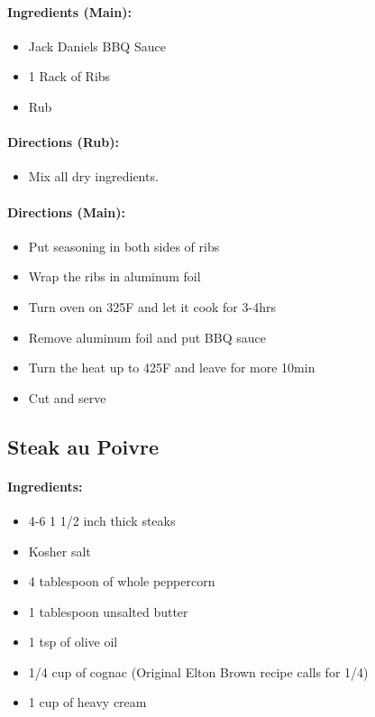 \documentclass{article}
\begin{document}
\paragraph{Ingredients (Main):}
\begin{itemize}
    \item Jack Daniels BBQ Sauce
    \item 1 Rack of Ribs
    \item Rub
\end{itemize}  

\paragraph{Directions (Rub):}
\begin{itemize}
    \item Mix all dry ingredients.
\end{itemize}  

\paragraph{Directions (Main):}
\begin{itemize}
    \item Put seasoning in both sides of ribs
    \item Wrap the ribs in aluminum foil
    \item Turn oven on 325F and let it cook for 3-4hrs
    \item Remove aluminum foil and put BBQ sauce
    \item Turn the heat up to 425F and leave for more 10min
    \item Cut and serve
\end{itemize} 

\subsection{Steak au Poivre}

\paragraph{Ingredients:}
\begin{itemize}
    \item 4-6 1 1/2 inch thick steaks
    \item Kosher salt
    \item 4 tablespoon of whole peppercorn
    \item 1 tablespoon unsalted butter
    \item 1 tsp of olive oil
    \item 1/4 cup of cognac (Original Elton Brown recipe calls for 1/4)
    \item 1 cup of heavy cream
\end{itemize}
\end{document}
